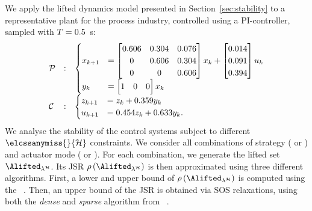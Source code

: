We apply the lifted dynamics model presented in Section~\ref{sec:stability} to a representative plant for the process industry, controlled using a PI-controller, sampled with $T = 0.5$~s:
\begin{equation*}
    \begin{array}{lcl}
        \mathcal{P} & : &\begin{cases}
            x_{k+1} &= \begin{bmatrix}
                0.606 & 0.304 & 0.076 \\
                0 & 0.606 & 0.304 \\
                0 & 0 & 0.606 \\
            \end{bmatrix} x_k + \begin{bmatrix}
                0.014 \\
                0.091 \\
                0.394 \\
            \end{bmatrix} u_k \\
            y_k &= \begin{bmatrix}1 & 0 & 0\end{bmatrix} x_k
        \end{cases}\\
        \mathcal{C} & : &\begin{cases}
            z_{k+1} &= z_k + 0.359 y_k \\
            u_{k+1} &= 0.454 z_k + 0.633 y_k.  
        \end{cases}
    \end{array}
\end{equation*}
We analyse the stability of the control systems subject to different $\elcssanymiss{}{\strat}$ constraints.
We consider all combinations of strategy (\tK{} or \tS{}) and actuator mode (\tZ{} or \tH{}).
%
For each combination, we generate the lifted set $\Alifted_{\lambda^\strat}$. Its JSR $\rho \left( \Alifted_{\lambda^\strat} \right)$ is then approximated using three different algorithms.
First, a lower and upper bound of $\rho \left( \Alifted_{\lambda^\strat} \right)$ is computed using the ~\cite{vankeerberghen2014jsr}.
Then, an upper bound of the JSR is obtained via SOS relaxations, using both the \emph{dense} and \emph{sparse} algorithm from ~\cite{sparsejsr}.

\afterpage{
    \clearpage
    \begin{landscape}
        
    \end{landscape}
    \clearpage
}

